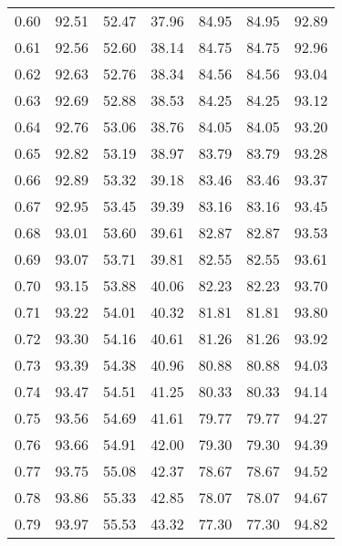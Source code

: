 \begin{tabular}{|c|c|c|c|c|c|c|}
      0.60 &     92.51 &     52.47 &      37.96 &   84.95 &      84.95 &         92.89 \\
      0.61 &     92.56 &     52.60 &      38.14 &   84.75 &      84.75 &         92.96 \\
      0.62 &     92.63 &     52.76 &      38.34 &   84.56 &      84.56 &         93.04 \\
      0.63 &     92.69 &     52.88 &      38.53 &   84.25 &      84.25 &         93.12 \\
      0.64 &     92.76 &     53.06 &      38.76 &   84.05 &      84.05 &         93.20 \\
      0.65 &     92.82 &     53.19 &      38.97 &   83.79 &      83.79 &         93.28 \\
      0.66 &     92.89 &     53.32 &      39.18 &   83.46 &      83.46 &         93.37 \\
      0.67 &     92.95 &     53.45 &      39.39 &   83.16 &      83.16 &         93.45 \\
      0.68 &     93.01 &     53.60 &      39.61 &   82.87 &      82.87 &         93.53 \\
      0.69 &     93.07 &     53.71 &      39.81 &   82.55 &      82.55 &         93.61 \\
      0.70 &     93.15 &     53.88 &      40.06 &   82.23 &      82.23 &         93.70 \\
      0.71 &     93.22 &     54.01 &      40.32 &   81.81 &      81.81 &         93.80 \\
      0.72 &     93.30 &     54.16 &      40.61 &   81.26 &      81.26 &         93.92 \\
      0.73 &     93.39 &     54.38 &      40.96 &   80.88 &      80.88 &         94.03 \\
      0.74 &     93.47 &     54.51 &      41.25 &   80.33 &      80.33 &         94.14 \\
      0.75 &     93.56 &     54.69 &      41.61 &   79.77 &      79.77 &         94.27 \\
      0.76 &     93.66 &     54.91 &      42.00 &   79.30 &      79.30 &         94.39 \\
      0.77 &     93.75 &     55.08 &      42.37 &   78.67 &      78.67 &         94.52 \\
      0.78 &     93.86 &     55.33 &      42.85 &   78.07 &      78.07 &         94.67 \\
      0.79 &     93.97 &     55.53 &      43.32 &   77.30 &      77.30 &         94.82 \\

\end{tabular}
